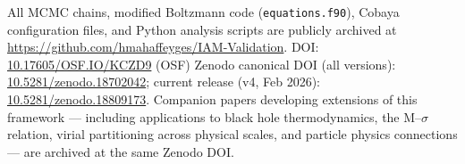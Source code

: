\documentclass[twocolumn,a4paper,aps,prd,twocolumn,showpacs,notitlepage,superscriptaddress,nofootinbib]{article}
\begin{document}
All MCMC chains, modified Boltzmann code (\texttt{equations.f90}),
Cobaya configuration files, and Python analysis scripts are publicly archived
at \url{https://github.com/hmahaffeyges/IAM-Validation}.
DOI: \href{https://doi.org/10.17605/OSF.IO/KCZD9}{10.17605/OSF.IO/KCZD9} (OSF)
Zenodo canonical DOI (all versions): \href{https://doi.org/10.5281/zenodo.18702042}{10.5281/zenodo.18702042}; current release (v4, Feb 2026): \href{https://doi.org/10.5281/zenodo.18809173}{10.5281/zenodo.18809173}.
Companion papers developing extensions of this framework --- including applications to black hole thermodynamics, the M--$\sigma$ relation, virial partitioning across physical scales, and particle physics connections --- are archived at the same Zenodo DOI.


\end{document}

